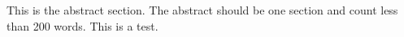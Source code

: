 This is the abstract section. The abstract should be one section and count less than 200 words. This is a test.